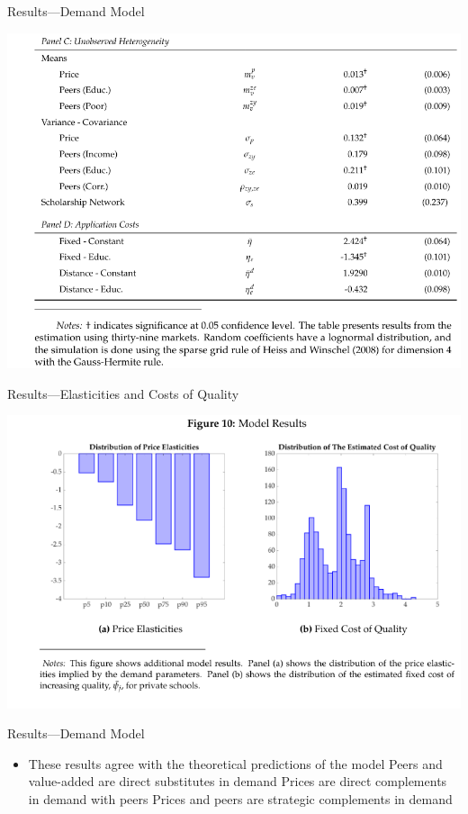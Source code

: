 \documentclass[dvipsnames]{beamer}
\begin{document}
%
\begin{frame}{Results---Demand Model}
  \begin{center}
    \includegraphics[width=\textwidth, keepaspectratio=true]{figs/tab6-2.png}
  \end{center}
\end{frame}
\begin{frame}{Results---Elasticities and Costs of Quality}
  \begin{center}
    \includegraphics[width=\textwidth, keepaspectratio=true]{figs/fig10.png}
  \end{center}
\end{frame}
%
\begin{frame}{Results---Demand Model}
  \begin{itemize}
  \item These results agree with the theoretical predictions of the model
    \vitem Peers and value-added are direct substitutes in demand
    \vitem Prices are direct complements in demand with peers
    \vitem Prices and peers are strategic complements in demand
  \end{itemize}
\end{frame}
\end{document}
